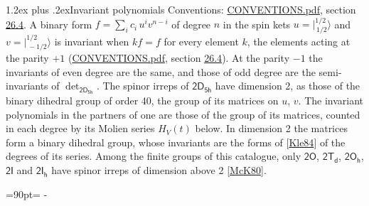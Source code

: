 \documentclass[10pt,a4paper]{article}
\makeatletter
\renewcommand\section{\@startsection{section}{1}{\z@}{-3ex plus -1ex minus -.2ex}%
  {1.2ex plus .2ex}{\normalfont\large\sffamily\bfseries\color{parttitle}}}
\newcommand{\needspace}[1]{\par\penalty-100\begingroup\dimen0=#1\relax\dimen2=\pagegoal
  \advance\dimen2-\pagetotal\ifdim\dimen0>\dimen2\relax\ifdim\dimen2>0pt\vfil\break\fi\fi
  \endgroup}
\numberwithin{equation}{section}
\newcommand{\grp}[1]{\mathsf{#1}}
\newcommand{\jm}[2]{\bigl\lvert{}^{#1}_{\,#2}\bigr\rangle}
\makeatother
\begin{document}
\section{Invariant polynomials}\label{s:invariants}
Conventions: \href{../../CONVENTIONS.pdf}{CONVENTIONS.pdf}, section \href{../../CONVENTIONS.pdf\#conv.26.4}{26.4}.
\leavevmode\label{n:local.binary.form}A binary form $f = \sum_i c_i\, u^i v^{n-i}$ of degree $n$ in the spin kets $u = \jm{1/2}{1/2}$ and $v = \jm{1/2}{-1/2}$ is invariant when $k f = f$ for every element $k$, the elements acting at the parity $+1$ (\href{../../CONVENTIONS.pdf}{CONVENTIONS.pdf}, section \href{../../CONVENTIONS.pdf\#conv.26.4}{26.4}). At the parity $-1$ the invariants of even degree are the same, and those of odd degree are the semi-invariants of $\det_{\grp{2D_{5h}}}$.
The spinor irreps of $\grp{2D_{5h}}$ have dimension 2, as those of the binary dihedral group of order 40, the group of its matrices on $u$, $v$. \label{n:function.hilbert}The invariant polynomials in the partners of one are those of the group of its matrices, counted in each degree by its Molien series $H_V(t)$ below. In dimension 2 the matrices form a binary dihedral group, whose invariants are the forms of [\href{../../../REFERENCES.pdf\#ref.Kle84}{Kle84}] of the degrees of its series. Among the finite groups of this catalogue, only $\grp{2O}$, $\grp{2T_{d}}$, $\grp{2O_{h}}$, $\grp{2I}$ and $\grp{2I_{h}}$ have spinor irreps of dimension above 2 [\href{../../../REFERENCES.pdf\#ref.McK80}{McK80}].
\needspace{90pt}
\end{document}
